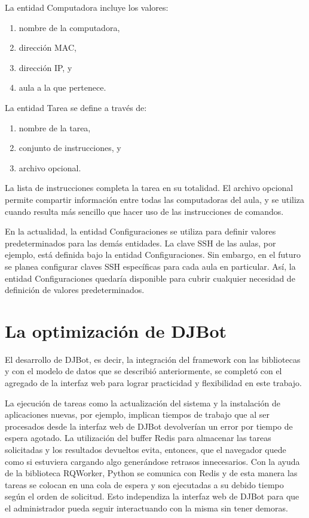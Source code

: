 \documentclass[runningheads,a4paper,titlepage]{llncs}
\begin{document}
La entidad Computadora incluye los valores:
\begin{enumerate}
\item{nombre de la computadora,}
\item{direcci\'on MAC,}
\item{direcci\'on IP, y}
\item{aula a la que pertenece.}
\end{enumerate}

La entidad Tarea se define a trav\'es de:
\begin{enumerate}
\item{nombre de la tarea,}
\item{conjunto de instrucciones, y}
\item{archivo opcional.}
\end{enumerate}

La lista de instrucciones completa la tarea en su totalidad. El archivo opcional
permite compartir informaci\'on entre todas las computadoras del aula, y se
utiliza cuando resulta m\'as sencillo que hacer uso de las instrucciones de
comandos.

En la actualidad, la entidad Configuraciones se utiliza para definir valores
predeterminados para las dem\'as entidades. La clave SSH de las aulas, por
ejemplo, est\'a definida bajo la entidad Configuraciones. Sin embargo, en el
futuro se planea configurar claves SSH espec\'ificas para cada aula en
particular. As\'i, la entidad Configuraciones quedar\'ia disponible para cubrir
cualquier necesidad de definici\'on de valores predeterminados.


\section{La optimización de DJBot}
\noindent El desarrollo de DJBot, es decir, la integraci\'on del framework con las
bibliotecas y con el modelo de datos que se describi\'o anteriormente,  se
complet\'o con el
agregado de la interfaz web para lograr practicidad y flexibilidad en este
trabajo.

La ejecuci\'on de tareas como la actualizaci\'on del
sistema y la instalaci\'on de aplicaciones nuevas, por ejemplo, implican tiempos
de trabajo que al ser procesados desde la interfaz web de DJBot devolver\'ian un
error por tiempo de espera agotado. La utilizaci\'on del buffer
Redis\cite{redis} para almacenar las tareas solicitadas y los resultados
devueltos evita, entonces, que el navegador quede como si estuviera cargando
algo generándose
retrasos innecesarios. Con la ayuda de la biblioteca RQWorker\cite{rqworker},
Python se comunica con Redis y de esta manera las tareas se colocan en una cola
de
espera y son ejecutadas a su debido tiempo seg\'un el orden de solicitud. Esto
independiza la interfaz web de DJBot para que el administrador pueda seguir interactuando con la misma sin tener demoras.
\end{document}
